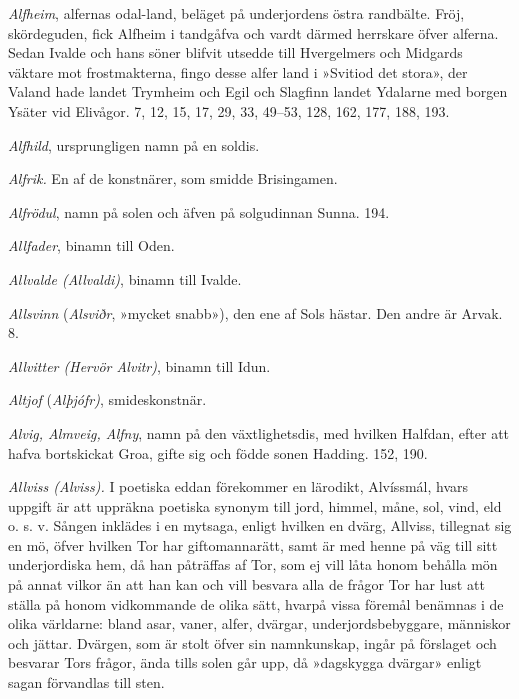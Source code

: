 \emph{Alfheim}, alfernas odal-land, beläget på underjordens östra
randbälte. Fröj, skördeguden, fick Alfheim i tandgåfva och vardt därmed
herrskare öfver alferna. Sedan Ivalde och hans söner blifvit utsedde
\protect\hypertarget{lb1625905.xhtmlux5cux23start200}{}{}\protect\hypertarget{lb1625905.xhtmlux5cux23start200-a}{}{}\protect\hypertarget{lb1625905.xhtmlux5cux23start200-b}{}{}\protect\hypertarget{lb1625905.xhtmlux5cux23start200-c}{}{}\protect\hypertarget{lb1625905.xhtmlux5cux23start200-d}{}{}
till Hvergelmers och Midgards väktare mot frostmakterna, fingo desse
alfer land i »Svitiod det stora», der Valand hade landet Trymheim och
Egil och Slagfinn landet Ydalarne med borgen Ysäter vid Elivågor. 7, 12,
15, 17, 29, 33, 49--53, 128, 162, 177, 188, 193.

\emph{Alfhild}, ursprungligen namn på en soldis.

\emph{Alfrik.} En af de konstnärer, som smidde Brisingamen.

\emph{Alfrödul}, namn på solen och äfven på solgudinnan Sunna. 194.

\emph{Allfader}, binamn till Oden.

\emph{Allvalde (Allvaldi)}, binamn till Ivalde.

\emph{Allsvinn} (\emph{Alsviðr}, »mycket snabb»), den ene af Sols
hästar. Den andre är Arvak. 8.

\emph{Allvitter (Hervör Alvitr)}, binamn till Idun.

\emph{Altjof} (\emph{Alþjófr)}, smideskonstnär.

\emph{Alvig, Almveig, Alfny}, namn på den växtlighetsdis, med hvilken
Halfdan, efter att hafva bortskickat Groa, gifte sig och födde sonen
Hadding. 152, 190.

\emph{Allviss (Alviss).} I poetiska eddan förekommer en lärodikt,
Alvíssmál, hvars uppgift är att uppräkna poetiska synonym till jord,
himmel, måne, sol, vind, eld o. s. v. Sången inklädes i en mytsaga,
enligt hvilken en dvärg, Allviss, tillegnat sig en mö, öfver hvilken Tor
har giftomannarätt, samt är med henne på väg till sitt underjordiska
hem, då han påträffas af Tor, som ej vill låta honom behålla mön på
annat vilkor än att han kan och vill besvara alla de frågor Tor har lust
att ställa på honom vidkommande de olika sätt, hvarpå vissa föremål
benämnas i de olika världarne: bland asar, vaner, alfer, dvärgar,
underjordsbebyggare, människor och jättar. Dvärgen, som är stolt öfver
sin namnkunskap, ingår på förslaget och besvarar Tors frågor, ända tills
solen går upp, då »dagskygga dvärgar» enligt sagan förvandlas till sten.

